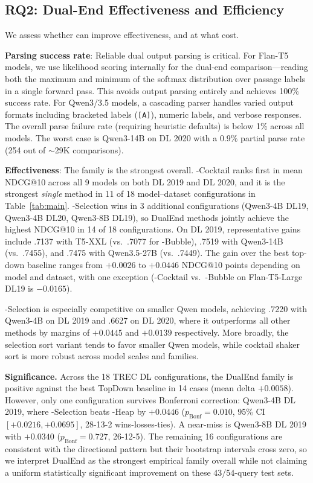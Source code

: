 \subsection{RQ2: Dual-End Effectiveness and Efficiency}
\label{sec:rq2}

We assess whether \dualend{} can improve effectiveness, and at what cost.

\textbf{Parsing success rate}: Reliable dual output parsing is critical. For Flan-T5 models, we use likelihood scoring internally for the dual-end comparison---reading both the maximum and minimum of the softmax distribution over passage labels in a single forward pass. This avoids output parsing entirely and achieves 100\% success rate. For Qwen3/3.5 models, a cascading parser handles varied output formats including bracketed labels (\texttt{[A]}), numeric labels, and verbose responses. The overall parse failure rate (requiring heuristic defaults) is below 1\% across all models. The worst case is Qwen3-14B on DL 2020 with a 0.9\% partial parse rate (254 out of ${\sim}$29K comparisons).

\textbf{Effectiveness}: The \dualend{} family is the strongest overall. \dualend{}-Cocktail ranks first in mean NDCG@10 across all 9 models on both DL 2019 and DL 2020, and it is the strongest \emph{single} method in 11 of 18 model--dataset configurations in Table~\ref{tab:main}. \dualend{}-Selection wins in 3 additional configurations (Qwen3-4B DL19, Qwen3-4B DL20, Qwen3-8B DL19), so DualEnd methods jointly achieve the highest NDCG@10 in 14 of 18 configurations. On DL 2019, representative gains include .7137 with T5-XXL (vs.\ .7077 for \topdown{}-Bubble), .7519 with Qwen3-14B (vs.\ .7455), and .7475 with Qwen3.5-27B (vs.\ .7449). The gain over the best top-down baseline ranges from $+0.0026$ to $+0.0446$ NDCG@10 points depending on model and dataset, with one exception (\dualend{}-Cocktail vs.\ \topdown{}-Bubble on Flan-T5-Large DL19 is $-0.0165$).

\dualend{}-Selection is especially competitive on smaller Qwen models, achieving .7220 with Qwen3-4B on DL 2019 and .6627 on DL 2020, where it outperforms all other methods by margins of $+0.0445$ and $+0.0139$ respectively. More broadly, the selection sort variant tends to favor smaller Qwen models, while cocktail shaker sort is more robust across model scales and families.

\textbf{Significance.} Across the 18 TREC DL configurations, the DualEnd family is positive against the best TopDown baseline in 14 cases (mean delta $+0.0058$). However, only one configuration survives Bonferroni correction: Qwen3-4B DL 2019, where \dualend{}-Selection beats \topdown{}-Heap by $+0.0446$ ($p_\text{Bonf}=0.010$, 95\% CI $[+0.0216, +0.0695]$, 28-13-2 wins-losses-ties). A near-miss is Qwen3-8B DL 2019 with $+0.0340$ ($p_\text{Bonf}=0.727$, 26-12-5). The remaining 16 configurations are consistent with the directional pattern but their bootstrap intervals cross zero, so we interpret DualEnd as the strongest empirical family overall while not claiming a uniform statistically significant improvement on these 43/54-query test sets.

